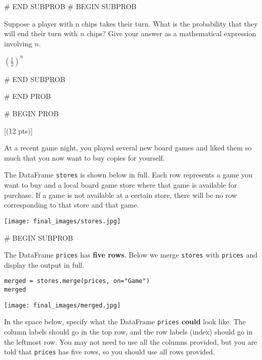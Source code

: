 \documentclass[twoside,12pt]{article}
\begin{document}
{# END SUBPROB
    # BEGIN SUBPROB


        Suppose a player with n chips takes their turn. What is the probability that they will end their turn with $n$ chips? Give your answer as a mathematical expression involving $n$.
        \begin{responsebox}{0.5in}
            $\left(\frac{1}{2}\right)^n$
        \end{responsebox}
    

# END SUBPROB





# END PROB

\newpage
# BEGIN PROB

[(12 pts)]

At a recent game night, you played several new board games and liked them so much that you now want to buy copies for yourself. 

The DataFrame \texttt{stores} is shown below in full. Each row represents a game you want to buy and a local board game store where that game is available for purchase. If a game is not available at a certain store, there will be no row corresponding to that store and that game.

\begin{center}
\texttt{[image: final\_images/stores.jpg]}
\end{center}


    # BEGIN SUBPROB


        The DataFrame \texttt{prices} has \textbf{five rows}. Below we merge \texttt{stores} with \texttt{prices} and display the output in full.

\begin{verbatim}
merged = stores.merge(prices, on="Game")
merged
\end{verbatim}

\begin{center}
\texttt{[image: final\_images/merged.jpg]}
\end{center}

\newpage

        In the space below, specify what the DataFrame \texttt{prices} \textbf{could} look like. The column labels should go in the top row, and the row labels (index) should go in the leftmost row. You may not need to use all the columns provided, but you are told that  \texttt{prices} has five rows, so you should use all rows provided.

        \vspace{0.1in}

}
\end{document}
